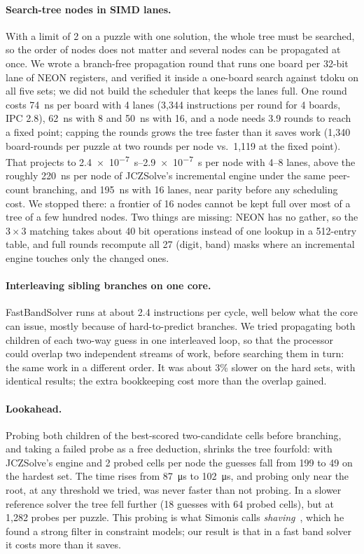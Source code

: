 \documentclass[11pt]{article}
\theoremstyle{definition}
\theoremstyle{plain}
\begin{document}
\paragraph{Search-tree nodes in SIMD lanes.} With a limit of 2 on a puzzle with one solution, the whole tree must be
searched, so the order of nodes does not matter and several nodes can be propagated at once. We wrote a branch-free
propagation round that runs one board per 32-bit lane of NEON registers, and verified it inside a one-board search
against tdoku on all five sets; we did not build the scheduler that keeps the lanes full. One round costs \SI{74}{\nano\second} per
board with 4 lanes (3{,}344 instructions per round for 4 boards, IPC 2.8), \SI{62}{\nano\second} with 8 and \SI{50}{\nano\second} with 16, and a
node needs 3.9 rounds to reach a fixed point; capping the rounds grows the tree faster than it saves work (1{,}340
board-rounds per puzzle at two rounds per node vs.\ 1{,}119 at the fixed point). That projects to \SIrange{2.4e-7}{2.9e-7}{\second} per
node with 4--8 lanes, above the roughly \SI{220}{\nano\second} per node of JCZSolve's incremental engine under the same peer-count
branching, and \SI{195}{\nano\second} with 16 lanes, near parity before any scheduling cost. We stopped there: a frontier of 16 nodes
cannot be kept full over most of a tree of a few hundred nodes. Two things are missing: NEON has no gather, so the $3\times 3$ matching takes about 40 bit
operations instead of one lookup in a 512-entry table, and full rounds recompute all 27 (digit, band) masks where an
incremental engine touches only the changed ones.

\paragraph{Interleaving sibling branches on one core.} FastBandSolver runs at about 2.4 instructions per cycle, well
below what the core can issue, mostly because of hard-to-predict branches. We tried propagating both children of each
two-way guess in one interleaved loop, so that the processor could overlap two independent streams of work, before
searching them in turn: the same work in a different order. It was about 3\% slower on the hard sets, with identical
results; the extra bookkeeping cost more than the overlap gained.

\paragraph{Lookahead.} Probing both children of the best-scored two-candidate cells before branching, and taking a
failed probe as a free deduction, shrinks the tree fourfold: with JCZSolve's engine and 2 probed cells per node the
guesses fall from 199 to 49 on the hardest set. The time rises from \SI{87}{\micro\second} to \SI{102}{\micro\second}, and probing only near the root, at
any threshold we tried, was never faster than not probing. In a slower reference solver the tree fell further (18
guesses with 64 probed cells), but at 1{,}282 probes per puzzle. This probing is what Simonis calls
\emph{shaving}~\cite{simonis2005sudoku}, which he found a strong filter in constraint models; our result is that in a
fast band solver it costs more than it saves.
\end{document}
